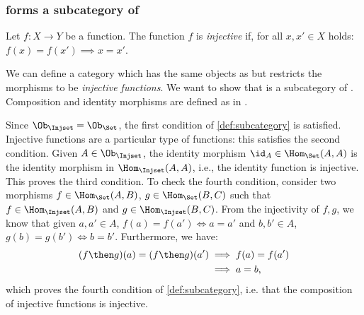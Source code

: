 \subsubsection{\Injset forms a subcategory of \Set}
\begin{definition}\label{def:injective-function}
Let $f\colon X\to Y$ be a function. The function $f$ is \emph{injective} if, for all $x,x'\in X$ holds: $f(x)=f(x')\implies x=x'$.
\end{definition}


\begin{example}
We can define a category \Injset which has the same objects as \Set but restricts the morphisms to be \emph{injective functions}.
We want to show that \Injset is a subcategory of \Set. Composition and identity morphisms are defined as in \Set.

Since $\Ob_{\Injset}=\Ob_{\Set}$, the first condition of \cref{def:subcategory} is satisfied. Injective functions are a particular type of functions: this satisfies the second condition. Given $A\in \Ob_{\Injset}$, the identity morphism $\id_A\in \Hom_{\Set}(A,A)$ is the identity morphism in $\Hom_{\Injset}(A,A)$, i.e., the identity function is injective. This proves the third condition. To check the fourth condition, consider two morphisms $f\in \Hom_\Set(A,B)$, $g\in \Hom_\Set(B,C)$ such that $f\in \Hom_\Injset(A,B)$ and $g\in \Hom_\Injset(B,C)$. From the injectivity of $f,g$, we know that given $a,a'\in A$, $f(a)=f(a') \Leftrightarrow a=a'$ and $b,b'\in A$, $g(b)=g(b') \Leftrightarrow b=b'$. Furthermore, we have:
\begin{equation*}
    \begin{aligned}
    (f\then g)(a)=(f\then g)(a')&\implies f(a)=f(a')\\
    &\implies a=b,
    \end{aligned}
\end{equation*}
which proves the fourth condition of \cref{def:subcategory}, i.e. that the composition of injective functions is injective.
\end{example}



